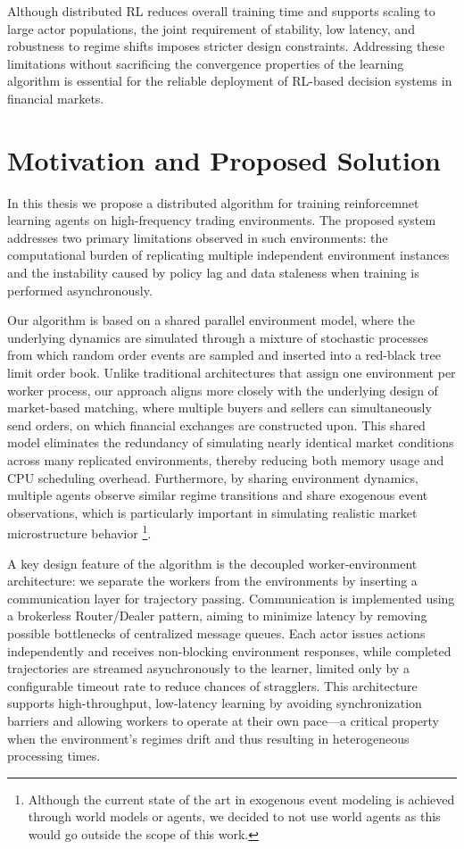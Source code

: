 Although distributed RL reduces overall training time and supports scaling to large actor populations,
the joint requirement of stability, low latency, and robustness to regime shifts imposes stricter design constraints.
Addressing these limitations without sacrificing the convergence properties of the learning algorithm is essential
for the reliable deployment of RL-based decision systems in financial markets.

\section{Motivation and Proposed Solution}
\label{sec:motivation}

In this thesis we propose a distributed algorithm for training reinforcemnet learning agents on high-frequency trading environments.
The proposed system addresses two primary limitations observed in such environments:
the computational burden of replicating multiple independent environment instances and the instability caused by
policy lag and data staleness when training is performed asynchronously.

Our algorithm is based on a shared parallel environment model, where the underlying dynamics are simulated
through a mixture of stochastic processes from which random order events are sampled and inserted into a red-black tree limit order book.
Unlike traditional architectures that assign one environment per worker process,
our approach aligns more closely with the underlying design of market-based matching,
where multiple buyers and sellers can simultaneously send orders, on which financial exchanges are constructed upon.
This shared model eliminates the redundancy of simulating nearly identical market conditions across many replicated environments,
thereby reducing both memory usage and CPU scheduling overhead.
Furthermore, by sharing environment dynamics, multiple agents observe similar regime transitions and share exogenous event observations,
which is particularly important in simulating realistic market microstructure behavior
\footnote{Although the current state of the art in exogenous event modeling is achieved through world models or agents,
we decided to not use world agents as this would go outside the scope of this work.}.

A key design feature of the algorithm is the decoupled worker-environment architecture:
we separate the workers from the environments by inserting a communication layer for trajectory passing.
Communication is implemented using a brokerless Router/Dealer pattern, aiming to minimize latency by
removing possible bottlenecks of centralized message queues.
Each actor issues actions independently and receives non-blocking environment responses,
while completed trajectories are streamed asynchronously to the learner,
limited only by a configurable timeout rate to reduce chances of stragglers.
This architecture supports high-throughput, low-latency learning by avoiding synchronization barriers and
allowing workers to operate at their own pace---a critical property when the environment's regimes drift and
thus resulting in heterogeneous processing times.

